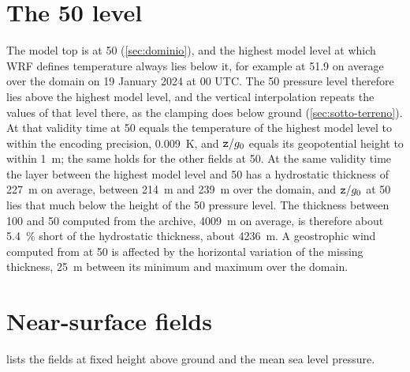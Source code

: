 \section{The \SI{50}{\hPa} level}
\label{sec:livello-50}

The model top is at \SI{50}{\hPa} (\cref{sec:dominio}), and the highest model level at which WRF
defines temperature always lies below it, for example at \SI{51.9}{\hPa} on average over the domain
on 19 January 2024 at 00 UTC. The \SI{50}{\hPa} pressure level therefore lies above the highest
model level, and the vertical interpolation repeats the
values of that level there, as the clamping does below ground (\cref{sec:sotto-terreno}). At that
validity time  at \SI{50}{\hPa} equals the temperature of the highest model level to
within the encoding precision, \SI{0.009}{K}, and $\campo{z}/g_0$ equals its geopotential height to
within \SI{1}{m}; the same holds for the other fields at \SI{50}{\hPa}. At the same validity time the
layer between the highest model level and \SI{50}{\hPa} has a hydrostatic thickness of \SI{227}{m}
on average, between \SI{214}{m} and \SI{239}{m} over the domain, and $\campo{z}/g_0$ at
\SI{50}{\hPa} lies that much below the height of the \SI{50}{\hPa} pressure level. The thickness
between \SI{100}{\hPa} and \SI{50}{\hPa} computed from the archive, \SI{4009}{m} on average, is
therefore about \SI{5.4}{\percent} short of the hydrostatic thickness, about \SI{4236}{m}. A
geostrophic wind computed from  at \SI{50}{\hPa} is affected by the horizontal variation of
the missing thickness, \SI{25}{m} between its minimum and maximum over the domain.

\section{Near-surface fields}
\label{sec:vicino-superficie}

 lists the fields at fixed height above ground and the mean sea level
pressure.

